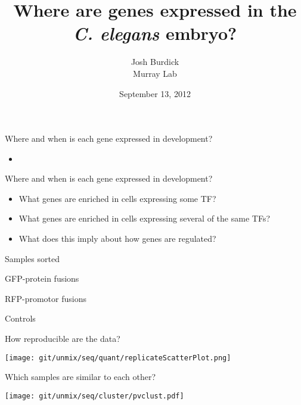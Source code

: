 \documentclass[serif,9pt]{beamer}
\title{Where are genes expressed in the {\em C. elegans} embryo?}
\author{Josh Burdick \\ Murray Lab}
\date{September 13, 2012}
\begin{document}
\begin{frame}
\titlepage
\end{frame}

\begin{frame}{Where and when is each gene expressed in development?}

\begin{itemize}

\item 

\end{itemize}

\end{frame}

\begin{frame}{Where and when is each gene expressed in development?}

\begin{itemize}

\item What genes are enriched in cells expressing some TF?

\item What genes are enriched in cells expressing several of the same TFs?

\item What does this imply about how genes are regulated?

\end{itemize}

\end{frame}

\begin{frame}{Samples sorted}

GFP-protein fusions


RFP-promotor fusions


Controls



\end{frame}

\begin{frame}{How reproducible are the data?}

\texttt{[image: git/unmix/seq/quant/replicateScatterPlot.png]}

\end{frame}

\begin{frame}{Which samples are similar to each other?}

\texttt{[image: git/unmix/seq/cluster/pvclust.pdf]}

\end{frame}
\end{document}
